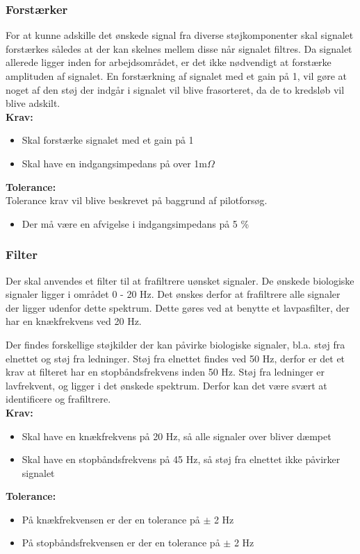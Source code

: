 \subsubsection{Forstærker}
For at kunne adskille det ønskede signal fra diverse støjkomponenter skal signalet forstærkes således at der kan skelnes mellem disse når signalet filtres. Da signalet allerede ligger inden for arbejdsområdet, er det ikke nødvendigt at forstærke amplituden af signalet. En forstærkning af signalet med et gain på 1, vil gøre at noget af den støj der indgår i signalet vil blive frasorteret, da de to kredsløb vil blive adskilt. \\
\textbf{Krav:}
\begin{itemize}
\item Skal forstærke signalet med et gain på 1
\item Skal have en indgangsimpedans på over 1m$\Omega$
\end{itemize}
\textbf{Tolerance:}\\
Tolerance krav vil blive beskrevet på baggrund af pilotforsøg.
\begin{itemize}
\item Der må være en afvigelse i indgangsimpedans på 5 \%
\end{itemize}

\subsubsection{Filter}
Der skal anvendes et filter til at frafiltrere uønsket signaler. De ønskede biologiske signaler ligger i området 0 - 20 Hz. Det ønskes derfor at frafiltrere alle signaler der ligger udenfor dette spektrum. Dette gøres ved at benytte et lavpasfilter, der har en knækfrekvens ved 20 Hz. 

Der findes forskellige støjkilder der kan påvirke biologiske signaler, bl.a. støj fra elnettet og støj fra ledninger. Støj fra elnettet findes ved 50 Hz, derfor er det et krav at filteret har en stopbåndsfrekvens inden 50 Hz. Støj fra ledninger er lavfrekvent, og ligger i det ønskede spektrum. Derfor kan det være svært at identificere og frafiltrere. \\
\textbf{Krav:}
\begin{itemize}
\item Skal have en knækfrekvens på 20 Hz, så alle signaler over bliver dæmpet
\item Skal have en stopbåndsfrekvens på 45 Hz, så støj fra elnettet ikke påvirker signalet
\end{itemize}
\textbf{Tolerance:}
\begin{itemize}
\item På knækfrekvensen er der en tolerance på $\pm$ 2 Hz
\item På stopbåndsfrekvensen er der en tolerance på $\pm$ 2 Hz
\end{itemize}
\newpage

